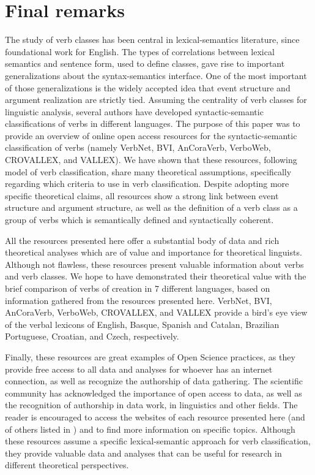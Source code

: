 \documentclass[english]{textolivre}
\begin{document}
\section{Final remarks} \label{Section5}

The study of verb classes has been central in lexical-semantics literature, since  foundational work for English. The types of correlations between lexical semantics and sentence form, used to define classes, gave rise to important generalizations about the syntax-semantics interface. One of the most important of those generalizations is the widely accepted idea that event structure and argument realization are strictly tied. Assuming the centrality of verb classes for linguistic analysis, several authors have developed syntactic-semantic classifications of verbs in different languages. The purpose of this paper was to provide an overview of online open access resources for the syntactic-semantic classification of verbs (namely VerbNet, BVI, AnCoraVerb, VerboWeb, CROVALLEX, and VALLEX). We have shown that these resources, following  model of verb classification, share many theoretical assumptions, specifically regarding which criteria to use in verb classification. Despite adopting more specific theoretical claims, all resources show a strong link between event structure and argument structure, as well as the definition of a verb class as a group of verbs which is semantically defined and syntactically coherent.

All the resources presented here offer a substantial body of data and rich theoretical analyses which are of value and importance for theoretical linguists. Although not flawless, these resources present valuable information about verbs and verb classes. We hope to have demonstrated their theoretical value with the brief comparison of verbs of creation in 7 different languages, based on information gathered from the resources presented here. VerbNet, BVI, AnCoraVerb, VerboWeb, CROVALLEX, and VALLEX provide a bird’s eye view of the verbal lexicons of English, Basque, Spanish and Catalan, Brazilian Portuguese, Croatian, and Czech, respectively.

Finally, these resources are great examples of Open Science practices, as they provide free access to all data and analyses for whoever has an internet connection, as well as recognize the authorship of data gathering. The scientific community has acknowledged the importance of open access to data, as well as the recognition of authorship in data work, in linguistics and other fields. The reader is encouraged to access the websites of each resource presented here (and of others listed in ) and to find more information on specific topics. Although these resources assume a specific lexical-semantic approach for verb classification, they provide valuable data and analyses that can be useful for research in different theoretical perspectives.
\end{document}
